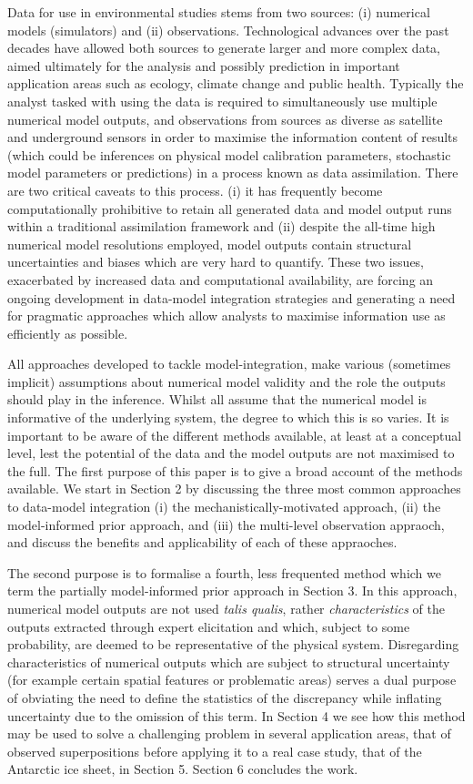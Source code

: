 \documentclass[10pt,a4paper]{article}
\begin{document}
Data for use in environmental studies stems from two sources: (i) numerical models (simulators) and (ii) observations. Technological advances over the past decades have allowed both sources to generate larger and more complex data, aimed ultimately for the analysis and possibly prediction in important application areas such as ecology, climate change and public health. Typically the analyst tasked with using the data is required to simultaneously use multiple numerical model outputs, and observations from sources as diverse as satellite and underground sensors in order to maximise the information content of results (which could be inferences on physical model calibration parameters, stochastic model parameters or predictions) in a process known as data assimilation. There are two critical caveats to this process. (i) it has frequently become computationally prohibitive to retain all generated data and model output runs within a traditional assimilation framework and (ii) despite the all-time high numerical model resolutions employed, model outputs contain structural uncertainties and biases which are very hard to quantify. These two issues, exacerbated by increased data and computational availability, are forcing an ongoing development in data-model integration strategies and generating a need for pragmatic approaches which allow analysts to maximise information use as efficiently as possible.

All approaches developed to tackle model-integration, make various (sometimes implicit) assumptions about numerical model validity and the role the outputs should play in the inference. Whilst all assume that the numerical model is informative of the underlying system, the degree to which this is so varies. It is important to be aware of the different methods available, at least at a conceptual level, lest the potential of the data and the model outputs are not maximised to the full. The first purpose of this paper is to give a broad account of the methods available. We start in Section 2 by discussing the three most common approaches to data-model integration (i) the mechanistically-motivated approach, (ii) the model-informed prior approach, and (iii) the multi-level observation appraoch, and discuss the benefits and applicability of each of these appraoches.

The second purpose is to formalise a fourth, less frequented method which we term the partially model-informed prior approach in Section 3. In this  approach, numerical model outputs are not used \emph{talis qualis}, rather \emph{characteristics}  of the outputs extracted through expert elicitation and which, subject to some probability, are deemed to be representative of the physical system. Disregarding characteristics of numerical outputs which are subject to structural uncertainty (for example certain spatial features or problematic areas) serves a dual purpose of obviating the need to define the statistics of the discrepancy while inflating uncertainty due to the omission of this term.  In Section 4 we see how this method may be used to solve a challenging problem in several application areas, that of observed superpositions before applying it to a real case study, that of the Antarctic ice sheet, in Section 5. Section 6 concludes the work.
\end{document}
